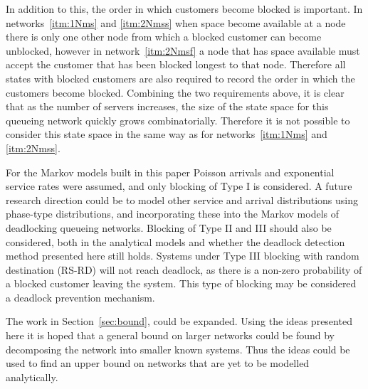 \documentclass{article}
\numberwithin{equation}{section}
\begin{document}
In addition to this, the order in which customers become blocked is important.
In networks~\ref{itm:1Nms} and \ref{itm:2Nmss} when space become available at
a node there is only one other node from which a blocked customer can become
unblocked, however in network~\ref{itm:2Nmsf} a node that has space available
must accept the customer that has been blocked longest to that node.
Therefore all states with blocked customers are also required to record the
order in which the customers become blocked.
Combining the two requirements above, it is clear that as the number of
servers increases, the size of the state space for this queueing network
quickly grows combinatorially.
Therefore it is not possible to consider this state space in the same way as
for networks~\ref{itm:1Nms} and \ref{itm:2Nmss}.

For the Markov models built in this paper Poisson arrivals and exponential
service rates were assumed, and only blocking of Type I is considered.
A future research direction could be to model other service and arrival
distributions using phase-type distributions, and incorporating these into the
Markov models of deadlocking queueing networks.
Blocking of Type II and III should also be considered, both in the analytical
models and whether the deadlock detection method presented here still holds.
Systems under Type III blocking with random destination (RS-RD) will not reach
deadlock, as there is a non-zero probability of a blocked customer leaving the
system.
This type of blocking may be considered a deadlock prevention mechanism.

The work in Section~\ref{sec:bound}, could be expanded.
Using the ideas presented here it is hoped that a general bound on larger
networks could be found by decomposing the network into smaller known systems.
Thus the ideas could be used to find an upper bound on networks that are yet
to be modelled analytically.





\end{document}
